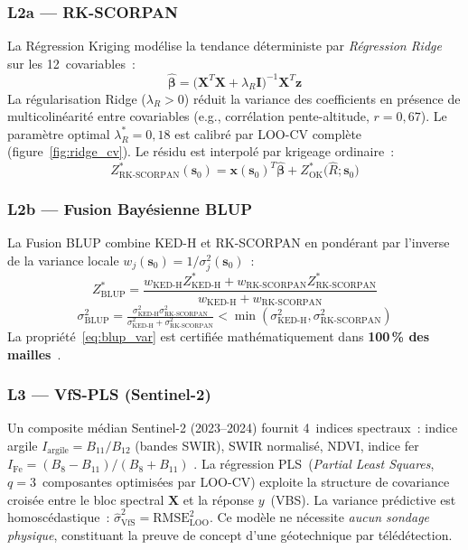 \documentclass[10pt,a4paper,twocolumn]{article}
\newcommand{\bs}{\mathbf{s}}
\newcommand{\KED}{\text{KED-H}}
\newcommand{\RK}{\text{RK-SCORPAN}}
\newcommand{\BLUP}{\text{BLUP}}
\begin{document}
	\subsubsection{L2a --- RK-SCORPAN}
	\label{subsec:rk}
	
	La Régression Kriging modélise la tendance déterministe par
	\emph{Régression Ridge} sur les 12~covariables~:
	\begin{equation}
		\hat{\bm{\beta}}=
		\bigl(\mathbf{X}^T\mathbf{X}+\lambda_R\mathbf{I}\bigr)^{-1}
		\mathbf{X}^T\mathbf{z}
		\label{eq:ridge}
	\end{equation}
	La régularisation Ridge ($\lambda_R>0$) réduit la variance des
	coefficients en présence de multicolinéarité entre covariables
	(e.g., corrélation pente-altitude, $r=0{,}67$).
	Le paramètre optimal $\lambda_R^*=0{,}18$ est calibré par
	LOO-CV complète (figure~\ref{fig:ridge_cv}).
	Le résidu est interpolé par krigeage ordinaire~:
	\begin{equation}
		Z^*_{\RK}(\bs_0)=\mathbf{x}(\bs_0)^T\hat{\bm{\beta}}
		+Z^*_{\mathrm{OK}}\!\bigl(\hat{R};\bs_0\bigr)
		\label{eq:rk_pred}
	\end{equation}
	
	\subsubsection{L2b --- Fusion Bayésienne BLUP}
	\label{subsec:fusion}
	
	La Fusion BLUP combine KED-H et RK-SCORPAN en pondérant
	par l'inverse de la variance locale
	$w_j(\bs_0)=1/\sigma^2_j(\bs_0)$~:
	\begin{equation}
		Z^*_{\BLUP} =
		\frac{w_{\KED}Z^*_{\KED}+w_{\RK}Z^*_{\RK}}
		{w_{\KED}+w_{\RK}}
		\label{eq:blup}
	\end{equation}
	\begin{equation}
		\sigma^2_{\BLUP} =
		\tfrac{\sigma^2_{\KED}\sigma^2_{\RK}}
		{\sigma^2_{\KED}+\sigma^2_{\RK}}
		< \min(\sigma^2_{\KED},\sigma^2_{\RK})
		\label{eq:blup_var}
	\end{equation}
	La propriété~\eqref{eq:blup_var} est certifiée mathématiquement
	dans \textbf{100\,\% des mailles}~\cite{chilesdelfiner2012}.
	
	\subsubsection{L3 --- VfS-PLS (Sentinel-2)}
	\label{subsec:vfs}
	
	Un composite médian Sentinel-2 (2023--2024) fournit 4~indices
	spectraux~: indice argile $I_{\mathrm{argile}}=B_{11}/B_{12}$
	(bandes SWIR), SWIR normalisé, NDVI, indice fer
	$I_{\mathrm{Fe}}=(B_8-B_{11})/(B_8+B_{11})$
	\cite{viscarra2006data}.
	La régression PLS~(\textit{Partial Least Squares},
	$q=3$~composantes optimisées par LOO-CV) exploite la structure
	de covariance croisée entre le bloc spectral $\mathbf{X}$ et la
	réponse $y$~(VBS). La variance prédictive est homoscédastique~:
	$\hat{\sigma}^2_{\mathrm{VfS}}=\mathrm{RMSE}^2_{\mathrm{LOO}}$.
	Ce modèle ne nécessite \emph{aucun sondage physique}, constituant
	la preuve de concept d'une géotechnique par télédétection.
	
\end{document}
